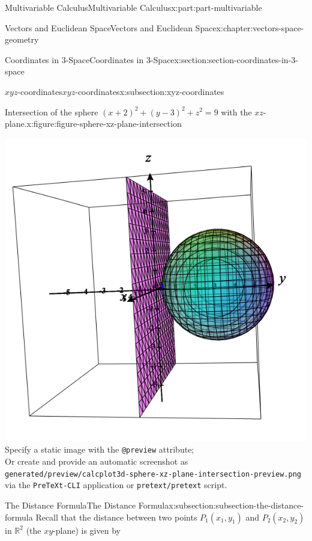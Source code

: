 \documentclass[twoside,10pt,]{book}
\newcommand{\mono}[1]{\texttt{#1}}
\numberwithin{equation}{part}
\newlength{\qrsize}
\newlength{\previewwidth}
\newcommand{\RR}{\mathbb{R}}
\begin{document}
\begin{partptx}{Multivariable Calculus}{}{Multivariable Calculus}{}{}{x:part:part-multivariable}
\begin{chapterptx}{Vectors and Euclidean Space}{}{Vectors and Euclidean Space}{}{}{x:chapter:vectors-space-geometry}
\begin{sectionptx}{Coordinates in 3-Space}{}{Coordinates in 3-Space}{}{}{x:section:section-coordinates-in-3-space}
\begin{subsectionptx}{\(xyz\)-coordinates}{}{\(xyz\)-coordinates}{}{}{x:subsection:xyz-coordinates}
\begin{figureptx}{Intersection of the sphere \((x+2)^2 + (y-3)^2 + z^2 = 9\) with the \(xz\)-plane.}{x:figure:figure-sphere-xz-plane-intersection}{}
\begin{tcbraster}[raster columns=2, raster column skip=1pt, raster halign=center, raster force size=false, raster left skip=0pt, raster right skip=0pt]
\begin{tcolorbox}[previewstyle, width=\previewwidth]
{\includegraphics[width=0.80\linewidth,height=\qrsize,keepaspectratio]{generated/preview/calcplot3d-sphere-xz-plane-intersection-preview.png}}%
{\small{}Specify a static image with the \mono{@preview} attribute;\\%
Or create and provide an automatic screenshot as\\%
\mono{generated/preview/calcplot3d-sphere-xz-plane-intersection-preview.png}\\%
via the \mono{PreTeXt-CLI} application or \mono{pretext/pretext} script.}%
\end{tcolorbox}%
\begin{tcolorbox}[qrstyle]%
{\hypersetup{urlcolor=black}}%
\end{tcolorbox}%
\end{tcbraster}%
\tcblower
\end{figureptx}%
\end{subsectionptx}
%
%
\typeout{************************************************}
\typeout{************************************************}
%
\begin{subsectionptx}{The Distance Formula}{}{The Distance Formula}{}{}{x:subsection:subsection-the-distance-formula}
Recall that the distance between two points \(P_{1}(x_{1},y_{1})\) and \(P_{2}(x_{2},y_{2})\) in \(\RR^{2}\) (the \(xy\)-plane) is given by%
%

\end{subsectionptx}
\end{sectionptx}
\end{chapterptx}
\end{partptx}
\end{document}
